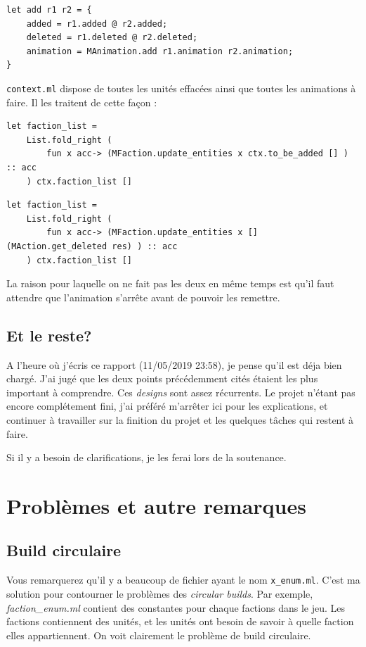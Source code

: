 \documentclass{article}
\begin{document}
\begin{verbatim}
let add r1 r2 = {
    added = r1.added @ r2.added;
    deleted = r1.deleted @ r2.deleted;
    animation = MAnimation.add r1.animation r2.animation;
} 
\end{verbatim}

\texttt{context.ml} dispose de toutes les unités effacées ainsi que toutes les animations à faire. Il les traitent de cette façon : 

\begin{verbatim}
let faction_list =
    List.fold_right (
        fun x acc-> (MFaction.update_entities x ctx.to_be_added [] ) :: acc
    ) ctx.faction_list []
\end{verbatim}

\begin{verbatim}
let faction_list =
    List.fold_right (
        fun x acc-> (MFaction.update_entities x [] (MAction.get_deleted res) ) :: acc
    ) ctx.faction_list []
\end{verbatim}

La raison pour laquelle on ne fait pas les deux en même temps est qu'il faut attendre que l'animation s'arrête avant de pouvoir les remettre.

\subsection{Et le reste?}

A l'heure où j'écris ce rapport (11/05/2019 23:58), je pense qu'il est déja bien chargé. J'ai jugé que les deux points précédemment cités étaient les
plus important à comprendre. Ces \textit{designs} sont assez récurrents. Le projet n'étant pas encore complétement fini,
j'ai préféré m'arrêter ici pour les explications, et continuer à travailler sur la finition du projet et les quelques tâches qui restent à faire.

Si il y a besoin de clarifications, je les ferai lors de la soutenance.

\section{Problèmes et autre remarques}
\subsection{Build circulaire}
Vous remarquerez qu'il y a beaucoup de fichier ayant le nom \texttt{x\_enum.ml}. C'est ma solution pour contourner le problèmes des
\textit{circular builds}. Par exemple, \textit{faction\_enum.ml} contient des constantes pour chaque factions dans le jeu.
Les factions contiennent des unités, et les unités ont besoin de savoir à quelle faction elles appartiennent. On voit clairement
le problème de build circulaire. 
\end{document}
